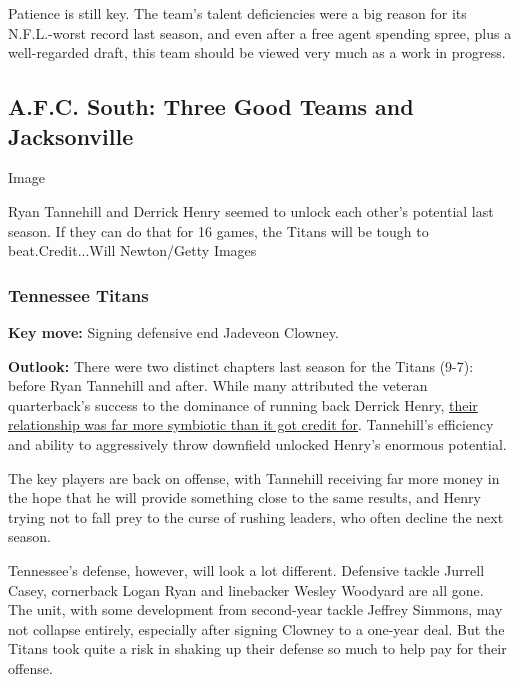 Patience is still key. The team's talent deficiencies were a big reason
for its N.F.L.-worst record last season, and even after a free agent
spending spree, plus a well-regarded draft, this team should be viewed
very much as a work in progress.

\hypertarget{afc-south-three-good-teams-and-jacksonville}{%
\subsection{A.F.C. South: Three Good Teams and
Jacksonville}\label{afc-south-three-good-teams-and-jacksonville}}

Image

Ryan Tannehill and Derrick Henry seemed to unlock each other's potential
last season. If they can do that for 16 games, the Titans will be tough
to beat.Credit...Will Newton/Getty Images

\hypertarget{tennessee-titans}{%
\subsubsection{\texorpdfstring{\textbf{Tennessee
Titans}}{Tennessee Titans}}\label{tennessee-titans}}

\textbf{Key move:} Signing defensive end Jadeveon Clowney.

\textbf{Outlook:} There were two distinct chapters last season for the
Titans (9-7): before Ryan Tannehill and after. While many attributed the
veteran quarterback's success to the dominance of running back Derrick
Henry,
\href{https://www.nytimes3xbfgragh.onion/2020/01/09/sports/football/titans-ravens-henry-tannehill.html}{their
relationship was far more symbiotic than it got credit for}. Tannehill's
efficiency and ability to aggressively throw downfield unlocked Henry's
enormous potential.

The key players are back on offense, with Tannehill receiving far more
money in the hope that he will provide something close to the same
results, and Henry trying not to fall prey to the curse of rushing
leaders, who often decline the next season.

Tennessee's defense, however, will look a lot different. Defensive
tackle Jurrell Casey, cornerback Logan Ryan and linebacker Wesley
Woodyard are all gone. The unit, with some development from second-year
tackle Jeffrey Simmons, may not collapse entirely, especially after
signing Clowney to a one-year deal. But the Titans took quite a risk in
shaking up their defense so much to help pay for their offense.

